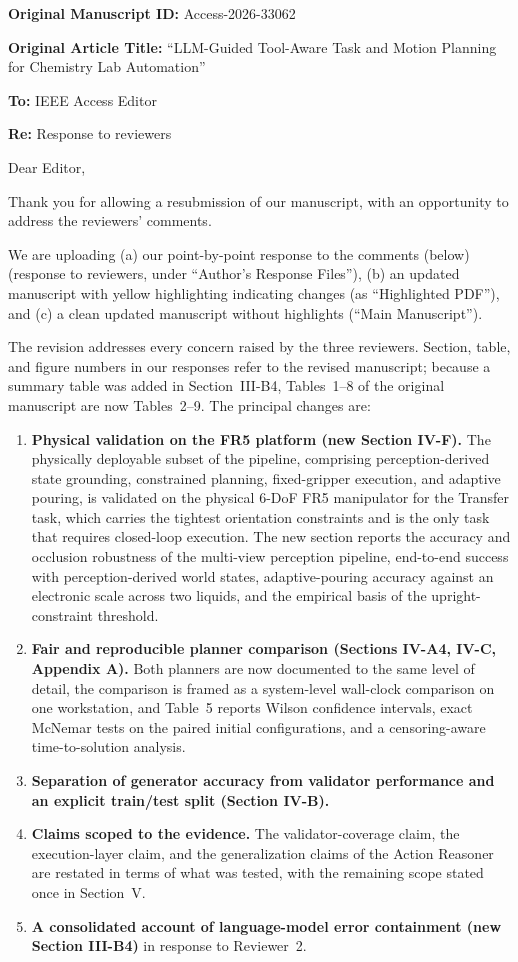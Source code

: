 \documentclass[11pt]{article}
\begin{document}
\textbf{Original Manuscript ID:} Access-2026-33062

\textbf{Original Article Title:} ``LLM-Guided Tool-Aware Task and Motion Planning for Chemistry Lab Automation''

\textbf{To:} IEEE Access Editor

\textbf{Re:} Response to reviewers

\bigskip
Dear Editor,

Thank you for allowing a resubmission of our manuscript, with an opportunity to address the reviewers' comments.

We are uploading (a) our point-by-point response to the comments (below) (response to reviewers, under ``Author's Response Files''), (b) an updated manuscript with yellow highlighting indicating changes (as ``Highlighted PDF''), and (c) a clean updated manuscript without highlights (``Main Manuscript'').

The revision addresses every concern raised by the three reviewers.
Section, table, and figure numbers in our responses refer to the revised manuscript; because a summary table was added in Section~III-B4, Tables~1--8 of the original manuscript are now Tables~2--9.
The principal changes are:
\begin{enumerate}[leftmargin=2em]
\item \textbf{Physical validation on the FR5 platform (new Section IV-F).}
The physically deployable subset of the pipeline, comprising perception-derived state grounding, constrained planning, fixed-gripper execution, and adaptive pouring, is validated on the physical 6-DoF FR5 manipulator for the Transfer task, which carries the tightest orientation constraints and is the only task that requires closed-loop execution.
The new section reports the accuracy and occlusion robustness of the multi-view perception pipeline, end-to-end success with perception-derived world states, adaptive-pouring accuracy against an electronic scale across two liquids, and the empirical basis of the upright-constraint threshold.
\item \textbf{Fair and reproducible planner comparison (Sections IV-A4, IV-C, Appendix A).}
Both planners are now documented to the same level of detail, the comparison is framed as a system-level wall-clock comparison on one workstation, and Table~5 reports Wilson confidence intervals, exact McNemar tests on the paired initial configurations, and a censoring-aware time-to-solution analysis.
\item \textbf{Separation of generator accuracy from validator performance and an explicit train/test split (Section IV-B).}
\item \textbf{Claims scoped to the evidence.}
The validator-coverage claim, the execution-layer claim, and the generalization claims of the Action Reasoner are restated in terms of what was tested, with the remaining scope stated once in Section~V.
\item \textbf{A consolidated account of language-model error containment (new Section III-B4)} in response to Reviewer~2.
\end{enumerate}
\end{document}
